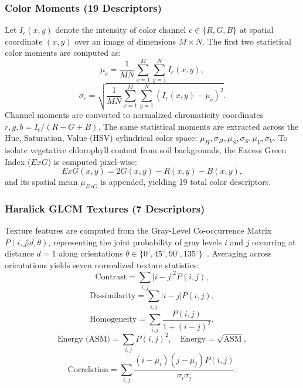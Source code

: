 \documentclass[conference,a4paper]{IEEEtran}
\begin{document}
\subsubsection{Color Moments (19 Descriptors)}
Let $I_c(x, y)$ denote the intensity of color channel $c \in \{R, G, B\}$ at spatial coordinate $(x, y)$ over an image of dimensions $M \times N$. The first two statistical color moments are computed as:
\begin{equation}
\mu_c = \frac{1}{MN} \sum_{x=1}^M \sum_{y=1}^N I_c(x, y),
\end{equation}
\begin{equation}
\sigma_c = \sqrt{\frac{1}{MN} \sum_{x=1}^M \sum_{y=1}^N \left( I_c(x, y) - \mu_c \right)^2}.
\end{equation}
Channel moments are converted to normalized chromaticity coordinates $r, g, b = I_c / (R + G + B)$. The same statistical moments are extracted across the Hue, Saturation, Value (HSV) cylindrical color space: $\mu_H, \sigma_H, \mu_S, \sigma_S, \mu_V, \sigma_V$. To isolate vegetative chlorophyll content from soil backgrounds, the Excess Green Index ($ExG$) is computed pixel-wise:
\begin{equation}
ExG(x, y) = 2G(x, y) - R(x, y) - B(x, y),
\end{equation}
and its spatial mean $\mu_{ExG}$ is appended, yielding 19 total color descriptors.

\subsubsection{Haralick GLCM Textures (7 Descriptors)}
Texture features are computed from the Gray-Level Co-occurrence Matrix $P(i, j | d, \theta)$, representing the joint probability of gray levels $i$ and $j$ occurring at distance $d=1$ along orientations $\theta \in \{0^\circ, 45^\circ, 90^\circ, 135^\circ\}$~\cite{haralick1973texture}. Averaging across orientations yields seven normalized texture statistics:
\begin{equation}
\text{Contrast} = \sum_{i,j} |i - j|^2 P(i, j),
\end{equation}
\begin{equation}
\text{Dissimilarity} = \sum_{i,j} |i - j| P(i, j),
\end{equation}
\begin{equation}
\text{Homogeneity} = \sum_{i,j} \frac{P(i, j)}{1 + (i - j)^2},
\end{equation}
\begin{equation}
\text{Energy (ASM)} = \sum_{i,j} P(i, j)^2, \quad \text{Energy} = \sqrt{\text{ASM}},
\end{equation}
\begin{equation}
\text{Correlation} = \sum_{i,j} \frac{(i - \mu_i)(j - \mu_j) P(i, j)}{\sigma_i \sigma_j}.
\end{equation}
\end{document}
